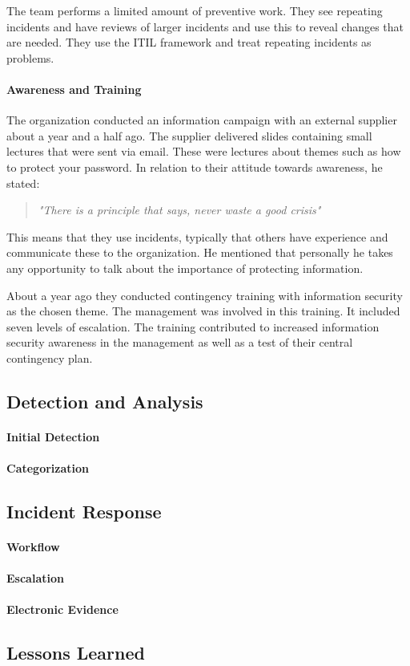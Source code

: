 The team performs a limited amount of preventive work. They see repeating incidents and have reviews of larger incidents and use this to reveal changes that are needed. They use the \ac{ITIL} framework and treat repeating incidents as problems.

\paragraph{Awareness and Training}
The organization conducted an information campaign with an external supplier about a year and a half ago. The supplier delivered slides containing small lectures that were sent via email. These were lectures about themes such as how to protect your password. In relation to their attitude towards awareness, he stated: 

\begin{quote}
\textit{"There is a principle that says, never waste a good crisis"}
\end{quote}

This means that they use incidents, typically that others have experience and communicate these to the organization. He mentioned that personally he takes any opportunity to talk about the importance of protecting information.

About a year ago they conducted contingency training with information security as the chosen theme. The management was involved in this training. It included seven levels of escalation. The training contributed to increased information security awareness in the management as well as a test of their central contingency plan.

\subsection{Detection and Analysis}

\paragraph{Initial Detection}

\paragraph{Categorization}

\subsection{Incident Response}

\paragraph{Workflow}

\paragraph{Escalation}

\paragraph{Electronic Evidence}

\subsection{Lessons Learned}